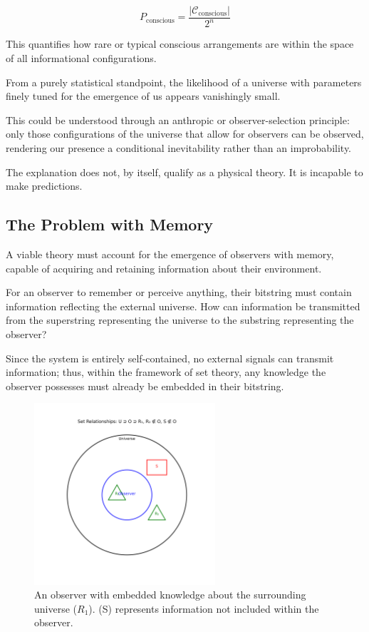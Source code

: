 \documentclass[11pt]{article}
\begin{document}
\[
      P_{\text{conscious}} = \frac{|\mathcal{C}_{\text{conscious}}|}{2^n}
\]

This quantifies how rare or typical conscious arrangements are within the space of all informational configurations.

From a purely statistical standpoint, the likelihood of a universe with parameters finely tuned for the emergence of us appears vanishingly small.

This could be understood through an anthropic or observer-selection principle: only those configurations of the universe that allow for observers can be observed, rendering our presence a conditional inevitability rather than an improbability.

The explanation does not, by itself, qualify as a physical theory. It is incapable to make predictions.


\subsection{The Problem with Memory}

A viable theory must account for the emergence of observers with memory, capable of acquiring and retaining information about their environment.

For an observer to remember or perceive anything, their bitstring must contain information reflecting the external universe. 
How can information be transmitted from the superstring representing the universe to the substring representing the observer? 

Since the system is entirely self-contained, no external signals can transmit information; thus, within the framework of set theory, 
any knowledge the observer possesses must already be embedded in their bitstring.

\begin{figure}[h!]
      \centering
      \includegraphics[width=0.6\textwidth]{figures/memory.png}
      \caption{An observer with embedded knowledge about the surrounding universe ($R_1$). (S) represents information not included within the observer.}

      \label{fig:memory}
\end{figure}
\end{document}
